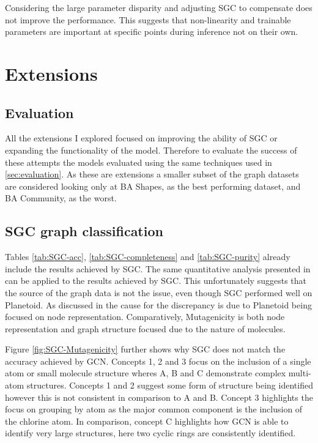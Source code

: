 Considering the large parameter disparity and adjusting SGC to compensate does not improve the performance.
This suggests that non-linearity and trainable parameters are important at specific points during inference not on their own.

\section{Extensions}
\label{sec:extension-eval}
\subsection{Evaluation}
All the extensions I explored focused on improving the ability of SGC or expanding the functionality of the model.
Therefore to evaluate the success of these attempts the models evaluated using the same techniques used in \ref{sec:evaluation}.
As these are extensions a smaller subset of the graph datasets are considered looking only at BA Shapes, as the best performing dataset, and BA Community, as the worst.

\subsection{SGC graph classification}
\label{SGC-graph}

Tables \ref{tab:SGC-acc}, \ref{tab:SGC-completeness} and \ref{tab:SGC-purity} already include the results achieved by SGC.
The same quantitative analysis presented in  can be applied to the results achieved by SGC.
This unfortunately suggests that the source of the graph data is not the issue, even though SGC performed well on Planetoid\cite{Fey/Lenssen/2019}.
As discussed in  the cause for the discrepancy is due to Planetoid\cite{Fey/Lenssen/2019} being focused on node representation.
Comparatively, Mutagenicity is both node representation and graph structure focused due to the nature of molecules.

Figure \ref{fig:SGC-Mutagenicity} further shows why SGC does not match the accuracy achieved by GCN.
Concepts 1, 2 and 3 focus on the inclusion of a single atom or small molecule structure wheres A, B and C demonstrate complex multi-atom structures.
Concepts 1 and 2 suggest some form of structure being identified however this is not consistent in comparison to A and B.
Concept 3 highlights the focus on grouping by atom as the major common component is the inclusion of the chlorine atom.
In comparison, concept C highlights how GCN is able to identify very large structures, here two cyclic rings are consistently identified.

